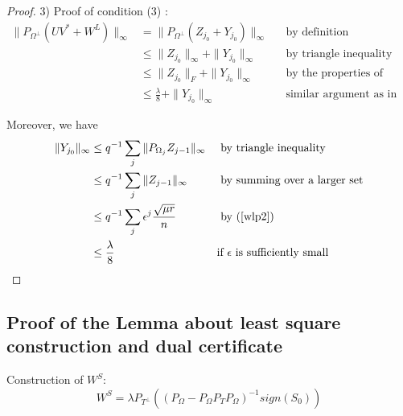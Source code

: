 \begin{proof}
3) Proof of condition (3) :
\begin{align*}
\|P_{\Omega^{\bot}}(UV^{*}+W^{L})\|_{\infty}
& = \|P_{\Omega^{\bot}}(Z_{j_{0}}+Y_{j_{0}})\|_{\infty}
&&\text{by definition}\\
& \le \|Z_{j_{0}}\|_{\infty} + \|Y_{j_{0}}\|_{\infty}
&&\text{by triangle inequality and summing over larger set}\\
& \le \|Z_{j_{0}}\|_{F} + \|Y_{j_{0}}\|_{\infty}
&&\text{by the properties of Frobenius and infinite norms}\\
& \le \frac{\lambda}{8} + \|Y_{j_{0}}\|_{\infty}
&&\text{similar argument as in Proof of condition (2)}
\end{align*}


Moreover, we have
\[
\begin{aligned}
\|Y_{j_{0}}\|_{\infty}
& \le q^{-1}\sum_{j}\|P_{\Omega_{j}}Z_{j-1}\|_{\infty}
&&\text{ by triangle inequality}\\
& \le q^{-1}\sum_{j}\|Z_{j-1}\|_{\infty}
&&\text{ by summing over a larger set}\\
& \le q^{-1}\sum_{j}\epsilon^{j}\frac{\sqrt{\mu r}}{n}
&&\text{ by (\ref{wlp2})}\\
& \le \frac{\lambda}{8}
&&\text{if } \epsilon \text{ is sufficiently small}
\end{aligned}
\]
\end{proof}


\subsection{Proof of the Lemma about least square construction and dual certificate }

Construction of $W^{S}$:
%
\[
W^{S}=\lambda P_{T^{\bot}}((P_{\Omega}-P_{\Omega}P_{T}P_{\Omega})^{-1}sign(S_{0}))
\]

